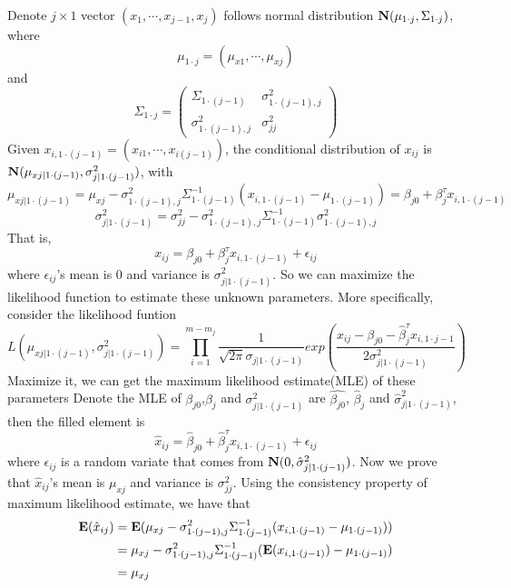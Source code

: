 \documentclass[a4,11pt,epsf, amssymb]{article}
\begin{document}
Denote $j \times 1$ vector $(x_1, \cdots, x_{j-1}, x_j)$ follows normal distribution  ${\bf N}(\mu_{1 \cdot j}, \Sigma_{1 \cdot j})$, where 
$$\mu_{1 \cdot j} = (\mu_{x1}, \cdots, \mu_{xj})$$ and
$$\Sigma_{1 \cdot j} =
\left(\begin{array} {cc}
\Sigma_{1 \cdot (j-1)} & \sigma_{1 \cdot (j-1),j}^2 \\
\sigma_{1 \cdot (j-1),j}^2 & \sigma_{jj}^2 
\end{array} \right)
$$
Given $x_{i,1 \cdot (j-1)} = (x_{i1}, \cdots, x_{i (j-1)})$, the conditional distribution of $x_{ij}$ is ${\bf N}(\mu_{xj | 1 \cdot (j-1)}, \sigma_{j | 1 \cdot (j-1)}^2)$, with 
$$\mu_{xj | 1 \cdot (j-1)} = \mu_{xj} - \sigma_{1 \cdot (j-1),j}^2 \Sigma_{1 \cdot (j-1)}^{-1} (x_{i,1 \cdot (j-1)} - \mu_{1\cdot (j-1)}) = \beta_{j0} + \beta_j^{\tau} x_{i,1 \cdot (j-1)}$$
$$ \sigma_{j | 1 \cdot (j-1)}^2 = \sigma_{jj}^2 - \sigma_{1 \cdot (j-1),j}^2 \Sigma_{1 \cdot (j-1)}^{-1}\sigma_{1 \cdot (j-1),j}^2 $$
That is,
$$x_{ij} = \beta_{j0} + \beta_j^{\tau} x_{i,1 \cdot (j-1)} + \epsilon_{ij}$$
where $\epsilon_{ij}$'s mean is 0 and variance is $\sigma_{j | 1 \cdot (j-1)}^2$. So we can maximize the likelihood function to estimate these unknown parameters. More specifically, consider the likelihood funtion
$$L(\mu_{xj | 1 \cdot (j-1)}, \sigma_{j | 1 \cdot (j-1)}^2) = \prod_{i = 1}^{m - m_j}\frac1{\sqrt{2\pi} \sigma_{j | 1 \cdot (j-1)}}exp(\frac{x_{ij} - \beta_{j0} - \hat{\beta}_j^{\tau} x_{i,1 \cdot {j-1}}}{2\sigma_{j | 1 \cdot (j-1)}^2})$$
Maximize it, we can get the maximum likelihood estimate(MLE) of these parameters
Denote the MLE of $\beta_{j0}$,$\beta_j$ and $\sigma_{j | 1 \cdot (j-1)}^2$ are $\hat{\beta_{j0}}$, $\hat{\beta}_j$ and $\hat{\sigma}_{j | 1 \cdot (j-1)}^2$, then the filled element is
$$\hat{x}_{ij} = \hat{\beta}_{j0} + \hat{\beta}_j^{\tau} x_{i,1 \cdot (j-1)} + \epsilon_{ij}$$
where $\epsilon_{ij}$ is a random variate that comes from ${\bf N}(0, \hat{\sigma}_{j | 1 \cdot (j-1)}^2)$. Now we prove that $\hat{x}_{ij}$'s mean is $\mu_{xj}$ and variance is $\sigma_{jj}^2$. Using the consistency property of maximum likelihood estimate, we have that
\begin{equation*}
	\begin{aligned}
{\bf E}(\hat{x}_{ij}) &= {\bf E}(\mu_{xj} - \sigma_{1 \cdot (j-1),j}^2 \Sigma_{1 \cdot (j-1)}^{-1} (x_{i,1 \cdot (j-1)} - \mu_{1\cdot (j-1)})) \\
				&= \mu_{xj} - \sigma_{1 \cdot (j-1),j}^2 \Sigma_{1 \cdot (j-1)}^{-1} ({\bf E}(x_{i,1 \cdot (j-1)}) - \mu_{1\cdot (j-1)}) \\
				& = \mu_{xj}
	\end{aligned}
\end{equation*}
\end{document}
